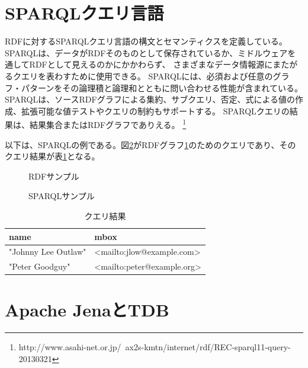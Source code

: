 \section{SPARQLクエリ言語}
\label{knowlegde:sparql}

RDFに対するSPARQLクエリ言語の構文とセマンティクスを定義している。
SPARQLは、データがRDFそのものとして保存されているか、ミドルウェアを通してRDFとして見えるのかにかかわらず、
さまざまなデータ情報源にまたがるクエリを表わすために使用できる。
SPARQLには、必須および任意のグラフ・パターンをその論理積と論理和とともに問い合わせる性能が含まれている。
SPARQLは、ソースRDFグラフによる集約、サブクエリ、否定、式による値の作成、拡張可能な値テストやクエリの制約もサポートする。
SPARQLクエリの結果は、結果集合またはRDFグラフでありえる。
\footnote{http://www.asahi-net.or.jp/~ax2s-kmtn/internet/rdf/REC-sparql11-query-20130321}

以下は、SPARQLの例である。図\ref{sparql_sample1}がRDFグラフ\ref{rdf_sample1}のためのクエリであり、そのクエリ結果が表\ref{table:sample_sparql_result}となる。

\begin{figure}[h!]
	\begin{center}
		
		\caption{RDFサンプル}
		\label{rdf_sample1}
	\end{center}
\end{figure}

\begin{figure}[h!]
	\begin{center}
		
		\caption{SPARQLサンプル}
		\label{sparql_sample1}
	\end{center}
\end{figure}

\begin{table}[h]
	\begin{center}
	\begin{tabular}{| l | l |}
		\hline
		\textbf{name} & \textbf{mbox} \\
		\hline
		"Johnny Lee Outlaw" & <mailto:jlow@example.com> \\
		\hline
		"Peter Goodguy" & <mailto:peter@example.org> \\
		\hline
	\end{tabular}
	\caption{クエリ結果}
	\label{table:sample_sparql_result}
	\end{center}
\end{table}
	
\section{Apache JenaとTDB}
\label{knowlegde:jena}

